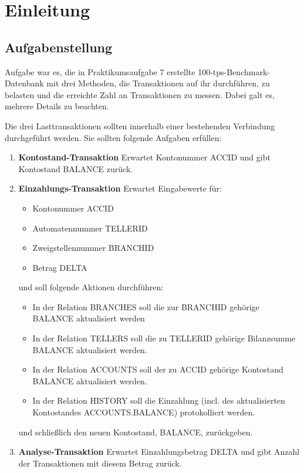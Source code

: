 \documentclass[a4paper, bibliography=totoc, 12pt]{scrartcl}
\begin{document}
\newpage
\setcounter{page}{1}
\section{Einleitung}
\subsection{Aufgabenstellung}%
Aufgabe war es, die in Praktikumsaufgabe 7 erstellte 100-tps-Benchmark-Datenbank mit drei Methoden, die Transaktionen auf ihr durchführen, zu belasten und die erreichte Zahl an Transaktionen zu messen. Dabei galt es, mehrere Details zu beachten.

\noindent
Die drei Lasttransaktionen sollten innerhalb einer bestehenden Verbindung durchgeführt werden. Sie sollten folgende Aufgaben erfüllen:
\begin{enumerate}
\itemsep0pt
\item \textbf{Kontostand-Transaktion}
Erwartet Kontonummer ACCID und gibt Kontostand BALANCE zurück.
\item \textbf{Einzahlungs-Transaktion}
Erwartet Eingabewerte für:
	\begin{itemize}
	\itemsep0pt
	\item Kontonummer ACCID
	\item Automatennummer TELLERID
	\item Zweigstellennummer BRANCHID
	\item Betrag DELTA
	\end{itemize}
\noindent	
und soll folgende Aktionen durchführen:
	\begin{itemize}
	\item In der Relation BRANCHES soll die zur BRANCHID gehörige BALANCE aktualisiert werden
	\item In der Relation TELLERS soll die zu TELLERID gehörige Bilanzsumme BALANCE
aktualisiert werden.
	\item In der Relation ACCOUNTS soll der zu ACCID gehörige Kontostand BALANCE
aktualisiert werden.
	\item In der Relation HISTORY soll die Einzahlung (incl. des aktualisierten Kontostandes
ACCOUNTS.BALANCE) protokolliert werden.
	\end{itemize}
und schließlich den neuen Kontostand, BALANCE, zurückgeben.
\item \textbf{Analyse-Transaktion}
Erwartet Einzahlungsbetrag DELTA und gibt Anzahl der Transaktionen mit diesem Betrag zurück.
\end{enumerate}
\end{document}
